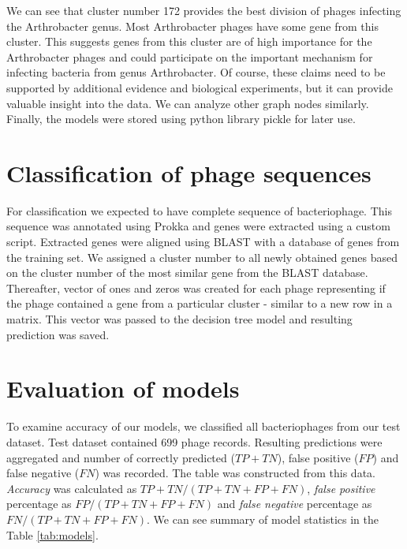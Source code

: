 We can see that cluster number 172 provides the best division of phages infecting the Arthrobacter genus.
Most Arthrobacter phages have some gene from this cluster.
This suggests genes from this cluster are of high importance for the Arthrobacter phages and could participate on the important mechanism for infecting bacteria from genus Arthrobacter.
Of course, these claims need to be supported by additional evidence and biological experiments, but it can provide valuable insight into the data.
We can analyze other graph nodes similarly.
Finally, the models were stored using python library pickle for later use.


\section{Classification of phage sequences}
For classification we expected to have complete sequence of bacteriophage.
This sequence was annotated using Prokka and genes were extracted using a custom script.
Extracted genes were aligned using BLAST with a database of genes from the training set.
We assigned a cluster number to all newly obtained genes based on the cluster number of the most similar gene from the BLAST database.
Thereafter, vector of ones and zeros was created for each phage representing if  the phage contained a gene from a particular cluster - similar to a new row in a matrix.
This vector was passed to the decision tree model and resulting prediction was saved.

\section{Evaluation of models}
To examine accuracy of our models, we classified all bacteriophages from our test dataset.
Test dataset contained 699 phage records.
Resulting predictions were aggregated and number of correctly predicted ($TP+TN$), false positive ($FP$) and false negative ($FN$) was recorded.
The table was constructed from this data.
\emph{Accuracy} was calculated as $TP+TN/(TP+TN+FP+FN)$, \emph{false positive} percentage as $FP/(TP+TN+FP+FN)$ and \emph{false negative} percentage as $FN/(TP+TN+FP+FN)$.
We can see summary of model statistics in the Table \ref{tab:models}.


